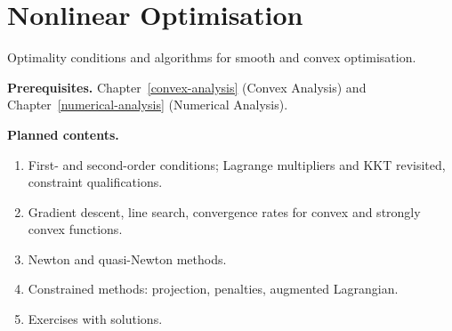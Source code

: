 \chapter{Nonlinear Optimisation}\label{nonlinear-optimisation}

Optimality conditions and algorithms for smooth and convex optimisation.

\noindent\textbf{Prerequisites.} Chapter~\ref{convex-analysis} (Convex Analysis) and Chapter~\ref{numerical-analysis} (Numerical Analysis).

\noindent\textbf{Planned contents.}
\begin{enumerate}
\item First- and second-order conditions; Lagrange multipliers and KKT revisited, constraint qualifications.
\item Gradient descent, line search, convergence rates for convex and strongly convex functions.
\item Newton and quasi-Newton methods.
\item Constrained methods: projection, penalties, augmented Lagrangian.
\item Exercises with solutions.
\end{enumerate}
